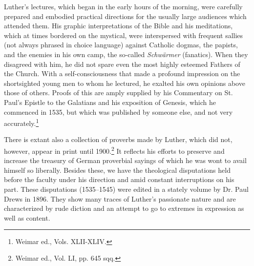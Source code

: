 Luther’s lectures, which began in the early hours of the morning,
were carefully prepared and embodied practical directions for the
usually large audiences which attended them. His graphic interpretations
of the Bible and his meditations, which at times bordered on the
mystical, were interspersed with frequent sallies (not always phrased
in choice language) against Catholic dogmas, the papists, and the
enemies in his own camp, the so-called \textit{Schwärmer} (fanatics). When
they disagreed with him, he did not spare even the most highly esteemed
Fathers of the Church. With a self-consciousness that made a
profound impression on the shortsighted young men to whom he
lectured, he exalted his own opinions above those of others. Proofs
of this are amply supplied by his Commentary on St. Paul’s Epistle to
the Galatians and his exposition of Genesis, which he commenced in
1535, but which was published by someone else, and not very accurately.\footnote{Weimar ed., Vols. XLII-XLIV.}

There is extant also a collection of proverbs made by Luther, which
did not, however, appear in print until 1900.\footnote{Weimar ed., Vol. LI, pp. 645 sqq.}
 It reflects his efforts
to preserve and increase the treasury of German proverbial sayings
of which he was wont to avail himself so liberally. Besides these, we
have the theological disputations held before the faculty under
his direction and amid constant interruptions on his part. These disputations
(1535--1545) were edited in a stately volume by Dr. Paul
Drews in 1896. They show many traces of Luther’s passionate nature
and are characterized by rude diction and an attempt to go to extremes
in expression as well as content.
